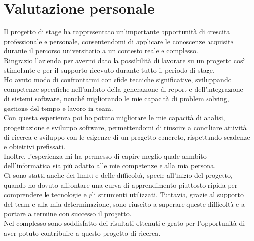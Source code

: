 \section{Valutazione personale}
Il progetto di stage ha rappresentato un'importante opportunità di crescita professionale e personale, consentendomi di applicare le conoscenze acquisite durante il percorso universitario a un contesto reale e complesso. \\
Ringrazio l'azienda per avermi dato la possibilità di lavorare su un progetto così stimolante e per il supporto ricevuto durante tutto il periodo di stage.\\
Ho avuto modo di confrontarmi con sfide tecniche significative, sviluppando competenze specifiche nell'ambito della generazione di report e dell'integrazione di sistemi software, nonché migliorando le mie capacità di problem solving, gestione del tempo e lavoro in team. \\
Con questa esperienza poi ho potuto migliorare le mie capacità di analisi, progettazione e sviluppo software, permettendomi di riuscire a conciliare attività di ricerca e sviluppo con le esigenze di un progetto concreto, rispettando scadenze e obiettivi prefissati.\\
Inoltre, l'esperienza mi ha permesso di capire meglio quale anmbito dell'informatica sia più adatto alle mie competenze e alla mia persona. \\
Ci sono statti anche dei limiti e delle difficoltà, specie all'inizio del progetto, quando ho dovuto affrontare una curva di apprendimento piuttosto ripida per comprendere le tecnologie e gli strumenti utilizzati. Tuttavia, grazie al supporto del team e alla mia determinazione, sono riuscito a superare queste difficoltà e a portare a termine con successo il progetto.\\
Nel complesso sono soddisfatto dei risultati ottenuti e grato per l'opportunità di aver potuto contribuire a questo progetto di ricerca.